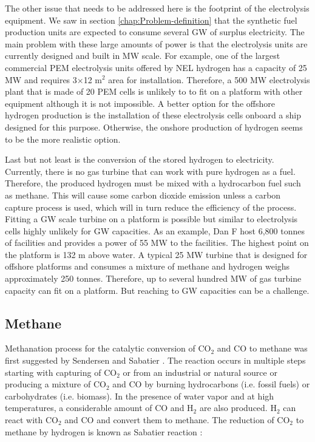 \documentclass{ECOS_2021}
\begin{document}
The other issue that needs to be addressed here is the footprint of
the electrolysis equipment. We saw in section \ref{chap:Problem-definition}
that the synthetic fuel production units are expected to consume several
GW of surplus electricity. The main problem with these large amounts
of power is that the electrolysis units are currently designed and
built in MW scale. For example, one of the largest commercial PEM
electrolysis units offered by NEL hydrogen has a capacity of 25 MW
and requires 3$\times$12 m$^{2}$ area for installation. Therefore,
a 500 MW electrolysis plant that is made of 20 PEM cells is unlikely
to to fit on a platform with other equipment although it is not impossible.
A better option for the offshore hydrogen production is the installation
of these electrolysis cells onboard a ship designed for this purpose.
Otherwise, the onshore production of hydrogen seems to be the more
realistic option.

Last but not least is the conversion of the stored hydrogen to electricity.
Currently, there is no gas turbine that can work with pure hydrogen
as a fuel. Therefore, the produced hydrogen must be mixed with a hydrocarbon
fuel such as methane. This will cause some carbon dioxide emission
unless a carbon capture process is used, which will in turn reduce
the efficiency of the process. Fitting a GW scale turbine on a platform
is possible but similar to electrolysis cells highly unlikely for
GW capacities. As an example, Dan F host 6,800 tonnes of facilities
and provides a power of 55 MW to the facilities. The highest point
on the platform is 132 m above water. A typical 25 MW turbine that
is designed for offshore platforms and consumes a mixture of methane
and hydrogen weighs approximately 250 tonnes. Therefore, up to several
hundred MW of gas turbine capacity can fit on a platform. But reaching
to GW capacities can be a challenge.

\sffamily \subsection{Methane}
\normalsize
Methanation process for the catalytic conversion of CO$_{2}$ and
CO to methane was first suggested by Sendersen and Sabatier \cite{boltCriticalReviewSynthetic2020}.
The reaction occurs in multiple steps starting with capturing of CO$_{2}$
or from an industrial or natural source or producing a mixture of
CO$_{2}$ and CO by burning hydrocarbons (i.e. fossil fuels) or carbohydrates
(i.e. biomass). In the presence of water vapor and at high temperatures,
a considerable amount of CO and H$_{2}$ are also produced. H$_{2}$
can react with CO$_{2}$ and CO and convert them to methane. The reduction
of CO$_{2}$ to methane by hydrogen is known as Sabatier reaction
\cite{boltCriticalReviewSynthetic2020}: 
\end{document}
